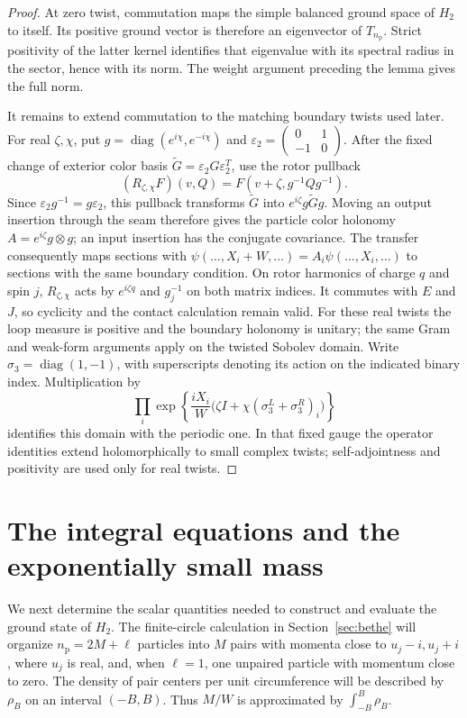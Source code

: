 \begin{proof}
At zero twist, commutation maps the simple balanced ground space of $H_2$
to itself.  Its positive ground vector is therefore an eigenvector of
$T_{n_{\mathrm p}}$.  Strict positivity of the latter kernel identifies
that eigenvalue with its spectral radius in the sector, hence with its
norm.  The weight argument preceding the lemma gives the full norm.

It remains to extend commutation to the matching boundary twists used
later.  For real $\zeta,\chi$, put
$g=\operatorname{diag}(e^{i\chi},e^{-i\chi})$ and
$\varepsilon_2=\left(\begin{smallmatrix}0&1\\-1&0\end{smallmatrix}\right)$.
After the fixed change of exterior color basis
$\widetilde G=\varepsilon_2G\varepsilon_2^T$, use the rotor pullback
\[
 (R_{\zeta,\chi}F)(v,Q)=F(v+\zeta,g^{-1}Qg^{-1}).
\]
Since $\varepsilon_2g^{-1}=g\varepsilon_2$, this pullback transforms
$\widetilde G$ into $e^{i\zeta}g\widetilde Gg$.
Moving an output insertion through the seam therefore gives the particle
color holonomy $A=e^{i\zeta}g\otimes g$; an input insertion has the
conjugate covariance.  The transfer consequently maps sections with
$\psi(\ldots,X_i+W,\ldots)=A_i\psi(\ldots,X_i,\ldots)$ to sections with
the same boundary condition.  On rotor harmonics of charge $q$ and spin
$j$, $R_{\zeta,\chi}$ acts by $e^{i\zeta q}$ and $g_j^{-1}$ on both
matrix indices.  It commutes with $E$ and $J$, so cyclicity and the contact
calculation remain valid.  For these real twists the loop measure is
positive and the boundary holonomy is unitary; the same Gram and weak-form
arguments apply on the twisted Sobolev domain.  Write
$\sigma_3=\operatorname{diag}(1,-1)$, with superscripts denoting its action
on the indicated binary index.  Multiplication by
\[
 \prod_i\exp\!\left\{\frac{iX_i}{W}
       \bigl(\zeta I+\chi(\sigma_3^L+\sigma_3^R)_i\bigr)\right\}
\]
identifies this domain with the periodic one.  In that fixed gauge the
operator identities extend holomorphically to small complex twists;
self-adjointness and positivity are used only for real twists.
\end{proof}

\section{The integral equations and the exponentially small mass}
\label{sec:integral}

We next determine the scalar quantities needed to construct and evaluate
the ground state of $H_2$.  The finite-circle calculation in
Section~\ref{sec:bethe} will organize $n_{\mathrm p}=2M+\ell$ particles
into $M$ pairs with momenta close to $u_j-i,u_j+i$, where $u_j$ is real,
and, when $\ell=1$, one unpaired particle with momentum close to zero.
The density of pair centers per unit circumference will be described by
$\rho_B$ on an interval $(-B,B)$.  Thus $M/W$ is approximated by
$\int_{-B}^B\rho_B$.

